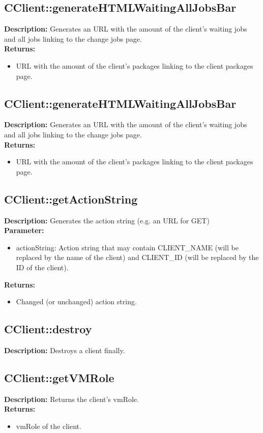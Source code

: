 \subsection{CClient::generateHTMLWaitingAllJobsBar}
\textbf{Description:} Generates an URL with the amount of the client's waiting jobs and all jobs linking to the change jobs page.\\
\textbf{Returns:}
\begin{itemize}
\item URL with the amount of the client's packages linking to the client packages page.
\end{itemize}

\subsection{CClient::generateHTMLWaitingAllJobsBar}
\textbf{Description:} Generates an URL with the amount of the client's waiting jobs and all jobs linking to the change jobs page.\\
\textbf{Returns:}
\begin{itemize}
\item URL with the amount of the client's packages linking to the client packages page.
\end{itemize}

\subsection{CClient::getActionString}
\textbf{Description:} Generates the action string (e.g. an URL for GET)\\
\textbf{Parameter:}
\begin{itemize}
\item actionString: Action string that may contain CLIENT\_NAME (will be replaced by the name of the client) and CLIENT\_ID (will be replaced by the ID of the client).
\end{itemize}
\textbf{Returns:}
\begin{itemize}
\item Changed (or unchanged) action string.
\end{itemize}

\subsection{CClient::destroy}
\textbf{Description:} Destroys a client finally.\\

\subsection{CClient::getVMRole}
\textbf{Description:} Returns the client's vmRole.\\
\textbf{Returns:}
\begin{itemize}
\item vmRole of the client.
\end{itemize}

